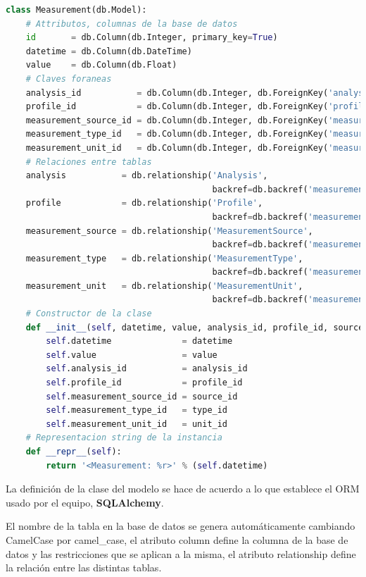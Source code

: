 \begin{lstlisting}[language=Python]
class Measurement(db.Model):
    # Attributos, columnas de la base de datos
    id       = db.Column(db.Integer, primary_key=True)
    datetime = db.Column(db.DateTime)
    value    = db.Column(db.Float)
    # Claves foraneas
    analysis_id           = db.Column(db.Integer, db.ForeignKey('analysis.id'))
    profile_id            = db.Column(db.Integer, db.ForeignKey('profile.id'))
    measurement_source_id = db.Column(db.Integer, db.ForeignKey('measurement_source.id'))
    measurement_type_id   = db.Column(db.Integer, db.ForeignKey('measurement_type.id'))
    measurement_unit_id   = db.Column(db.Integer, db.ForeignKey('measurement_unit.id'))
    # Relaciones entre tablas
    analysis           = db.relationship('Analysis',
                                         backref=db.backref('measurements', lazy='dynamic'))
    profile            = db.relationship('Profile',
                                         backref=db.backref('measurements', lazy='dynamic'))
    measurement_source = db.relationship('MeasurementSource',
                                         backref=db.backref('measurements', lazy='dynamic'))
    measurement_type   = db.relationship('MeasurementType',
                                         backref=db.backref('measurements', lazy='dynamic'))
    measurement_unit   = db.relationship('MeasurementUnit',
                                         backref=db.backref('measurements', lazy='dynamic'))
    # Constructor de la clase
    def __init__(self, datetime, value, analysis_id, profile_id, source_id, type_id, unit_id):
        self.datetime              = datetime
        self.value                 = value
        self.analysis_id           = analysis_id
        self.profile_id            = profile_id
        self.measurement_source_id = source_id
        self.measurement_type_id   = type_id
        self.measurement_unit_id   = unit_id
    # Representacion string de la instancia
    def __repr__(self):
        return '<Measurement: %r>' % (self.datetime)
\end{lstlisting}

La definición de la clase del modelo se hace de acuerdo a lo que establece el ORM usado por el equipo, \textbf{SQLAlchemy}.

El nombre de la tabla en la base de datos se genera automáticamente cambiando CamelCase por camel\_case, el atributo column define la columna de la base de datos y las restricciones que se aplican a la misma, el atributo relationship define la relación entre las distintas tablas.

